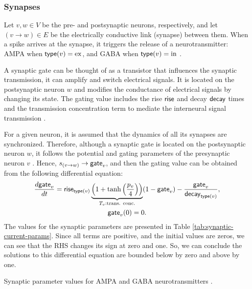 \subsubsection{Synapses}

Let $v, w \in V$ be the pre- and postsynaptic neurons, respectively, and let $(v \to w) \in E$ be the electrically conductive link (synapse) between them. When a spike arrives at the synapse, it triggers the release of a neurotransmitter: AMPA when $\mathsf{type}(v) = \mathrm{ex}$, and GABA when $\mathsf{type}(v) = \mathrm{in}$ \cite{Lowet2015}.

A synaptic gate can be thought of as a transistor that influences the synaptic transmission, it can amplify and switch electrical signals. It is located on the postsynaptic neuron $w$ and modifies the conductance of electrical signals by changing its state. The gating value includes the rise $\mathsf{rise}$ and decay $\mathsf{decay}$ times and the transmission concentration term to mediate the interneural signal transmission \cite{Destexhe1994}.

For a given neuron, it is assumed that the dynamics of all its synapses are synchronized. Therefore, although a synaptic gate is located on the postsynaptic neuron $w$, it follows the potential and gating parameters of the presynaptic neuron $v$ \cite{Lowet2015}. Hence, $s_{(v \to w)} \to \mathsf{gate}_v$, and then the gating value can be obtained from the following differential equation:
\begin{gather}
    \frac{d\mathsf{gate}_v}{dt} = \mathsf{rise}_{\mathsf{type}(v)} \underbrace{\left( 1 + \tanh \left( \frac{p_{v}}{4} \right) \right)}_{T_v: \text{trans. conc.}} (1 - \mathsf{gate}_v) - \frac{\mathsf{gate}_v}{\mathsf{decay}_{\mathsf{type}(v)}}, \\
    \label{eq:synaptic-gates}
    \mathsf{gate}_v(0) = 0.
\end{gather}
The values for the synaptic parameters are presented in Table \ref{tab:synaptic-current-params}.
Since all terms are positive, and the initial values are zeros, we can see that the RHS changes its sign at zero and one. So, we can conclude the solutions to this differential equation are bounded below by zero and above by one.

\begin{table}[!htp] 
    \centering
    
    \caption[Synaptic parameters]{Synaptic parameter values for AMPA and GABA neurotransmitters \cite{Lowet2015}.}
    \label{tab:synaptic-current-params}
\end{table}


